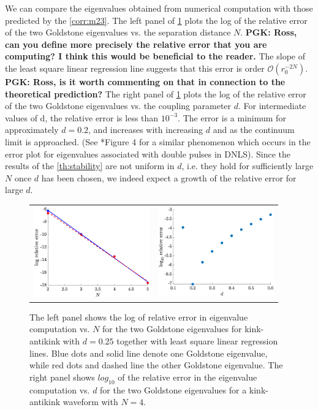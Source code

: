 \documentclass[12pt,reqno]{amsart}
\begin{document}
We can compare the eigenvalues obtained from numerical computation with those predicted by the \cref{corr:m23}. The left panel of \cref{fig:kakeigerror} plots the log of the relative error of the two Goldstone eigenvalues vs. the separation distance $N$. 
{\bf PGK: Ross, can you define more precisely the relative
error that you are computing? I think this would be beneficial
to the reader.}
The slope of the least square linear regression line suggests that this error is order $\mathcal{O}(r_0^{-2N})$. 
{\bf PGK: Ross, is it worth commenting on that in connection
to the theoretical prediction?}
The right panel of \cref{fig:kakeigerror} plots the log of the relative error of the two Goldstone eigenvalues vs. the coupling parameter $d$. For intermediate values of d, the relative error is less than $10^{-3}$. The error is a minimum for approximately $d = 0.2$, and increases with increasing $d$ and as the
continuum limit is approached. (See \cite{Parker2020}*{Figure 4} for a similar phenomenon which occurs in the error plot for eigenvalues associated with double pulses in DNLS). Since the results of the \cref{th:stability} are not uniform in $d$, i.e. they hold for sufficiently large $N$ once $d$ has been chosen, we 
indeed expect a growth of the relative error for large $d$.

\begin{figure}[H]
	\begin{center}
	\begin{tabular}{cc}
	\includegraphics[width=5cm]{goldstoned025relerror.eps} &
	\includegraphics[width=5cm]{goldstoneN4relativeerror.eps}
	\end{tabular}
	\end{center}
	\caption{The left panel shows the log of relative error in eigenvalue computation vs. $N$ for the two Goldstone eigenvalues for kink-antikink with $d = 0.25$ together with least square linear regression lines. Blue dots and solid line denote one Goldstone eigenvalue, while red dots and dashed line the other Goldstone eigenvalue. The right panel shows $log_{10}$ of the relative error in the eigenvalue computation vs. $d$ for the two Goldstone eigenvalues for a kink-antikink waveform
	with $N = 4$.} 
	\label{fig:kakeigerror}
\end{figure}
\end{document}
